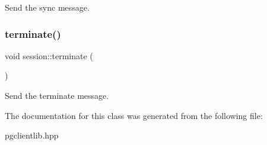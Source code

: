 Send the sync message. 

\mbox{\label{classsession_afb9f415bc0005e8ba4dbb88c15983bf2}} 
\subsubsection{\texorpdfstring{terminate()}{terminate()}}
{\footnotesize\ttfamily void session\+::terminate (\begin{DoxyParamCaption}{ }\end{DoxyParamCaption})\hspace{0.3cm}{\ttfamily [inline]}}



Send the terminate message. 



The documentation for this class was generated from the following file\+:\begin{DoxyCompactItemize}
\item 
pgclientlib.\+hpp\end{DoxyCompactItemize}
